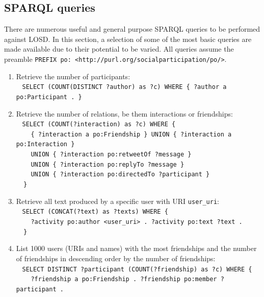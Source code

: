 \documentclass[journal,article,submit,moreauthors,pdftex]{Definitions/mdpi}
\newcommand{\textttt}[1] {\texttt{\footnotesize#1}}
\newcommand{\h} {\hphantom ~ }
\begin{document}
\subsection{SPARQL queries}\label{queries}
There are numerous useful and general purpose SPARQL queries to be performed against LOSD.
In this section, a selection of some of the most basic queries are made available due to their potential to be varied.
All queries assume the preamble \textttt{PREFIX po: <http://purl.org/socialparticipation/po/>}.
\begin{enumerate}[leftmargin=0cm]
	\item Retrieve the number of participants:\\
            \h\textttt{SELECT (COUNT(DISTINCT ?author) as ?c) WHERE \{
            ?author a po:Participant . \} }
	\item Retrieve the number of relations, be them interactions or
            friendships:\\
            \h\textttt{SELECT (COUNT(?interaction) as ?c) WHERE \{\\
            \h        \h \{ ?interaction a po:Friendship \} UNION \{ ?interaction
                    a po:Interaction \}\\
            \h        \h  UNION \{ ?interaction po:retweetOf
                    ?message \} \\
            \h\h  UNION \{ ?interaction po:replyTo ?message \}\\
            \h        \h UNION \{ ?interaction po:directedTo ?participant
                    \}\\
            \h\} }
                  \item Retrieve all text produced by a specific user with URI \textttt{user\_uri}:\\
            \h\textttt{SELECT (CONCAT(?text) as ?texts) WHERE \{\\
            \h        \h ?activity po:author <user\_uri> . ?activity po:text ?text .\\
            \h\}}
        \item List 1000 users (URIs and names) with the most friendships and the number of
            friendships in descending order by the number of friendships:\\
            \h\textttt{SELECT DISTINCT ?participant (COUNT(?friendship) as ?c) WHERE \{\\
            \h    \h ?friendship a po:Friendship . ?friendship po:member ?participant . \\
}
\end{enumerate}
\end{document}
